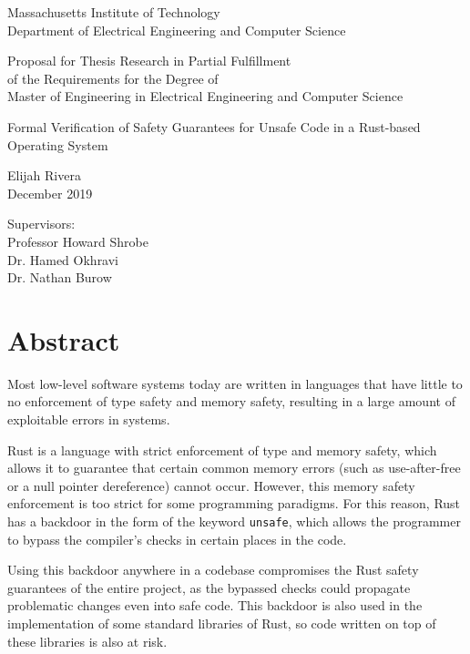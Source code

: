 \documentclass[12pt]{article}
\begin{document}
\begin{titlepage}
   \begin{center}
       \vspace*{1cm}
       Massachusetts Institute of Technology \\
       Department of Electrical Engineering and Computer Science
 
       \vspace{1cm}
       Proposal for Thesis Research in Partial Fulfillment \\
       of the Requirements for the Degree of \\
       Master of Engineering in Electrical Engineering and Computer Science
 
       \vspace{1cm}
 
       Formal Verification of Safety Guarantees for Unsafe Code in a Rust-based Operating System
 
       \vspace{1cm}
       Elijah Rivera \\
       December 2019
 
       \vspace{1cm}
        Supervisors: \\ Professor Howard Shrobe \\
        Dr. Hamed Okhravi \\
        Dr. Nathan Burow
   \end{center}
\end{titlepage}

\section*{Abstract}
Most low-level software systems today are written in languages that have little to no enforcement of type safety and memory safety, resulting in a large amount of exploitable errors in systems. 

Rust is a language with strict enforcement of type and memory safety, which allows it to guarantee that certain common memory errors (such as use-after-free or a null pointer dereference) cannot occur. However, this memory safety enforcement is too strict for some programming paradigms. For this reason, Rust has a backdoor in the form of the keyword \texttt{unsafe}, which allows the programmer to bypass the compiler's checks in certain places in the code.

Using this backdoor anywhere in a codebase compromises the Rust safety guarantees of the entire project, as the bypassed checks could propagate problematic changes even into safe code. This backdoor is also used in the implementation of some standard libraries of Rust, so code written on top of these libraries is also at risk.
\end{document}
